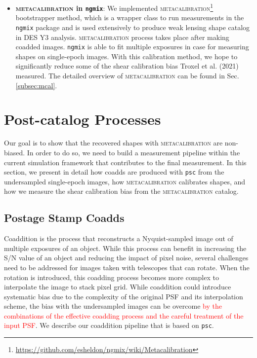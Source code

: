 \documentclass[fleqn,usenatbib]{mnras}
\begin{document}
\begin{itemize}
    \item \textbf{\textsc{metacalibration} in \texttt{ngmix}}: We implemented \textsc{metacalibration}\footnote{\url{https://github.com/esheldon/ngmix/wiki/Metacalibration}} bootstrapper method, which is a wrapper class to run measurements in the \texttt{ngmix} package and is used extensively to produce weak lensing shape catalog in DES Y3 analysis. \textsc{metacalibration} process takes place after making coadded images. \texttt{ngmix} is able to fit multiple exposures in case for measuring shapes on single-epoch images. With this calibration method, we hope to significantly reduce some of the shear calibration bias Troxel et al. (2021) measured. The detailed overview of \textsc{metacalibration} can be found in Sec.\ref{subsec:mcal}. 
\end{itemize}



\section{Post-catalog Processes}
\label{sec:methods}
Our goal is to show that the recovered shapes with \textsc{metacalibration} are non-biased. In order to do so, we need to build a measurement pipeline within the current simulation framework that contributes to the final measurement. In this section, we present in detail how coadds are produced with \texttt{psc} from the undersampled single-epoch images, how \textsc{metacalibration} calibrates shapes, and how we measure the shear calibration bias from the \textsc{metacalibration} catalog. 


\subsection{Postage Stamp Coadds}
\label{subsec:psc}
Coaddition is the process that reconstructs a Nyquist-sampled image out of multiple exposures of an object. While this process can benefit in increasing the S/N value of an object and reducing the impact of pixel noise, several challenges need to be addressed for images taken with telescopes that can rotate. When the rotation is introduced, this coadding process becomes more complex to interpolate the image to stack pixel grid. While coaddition could introduce systematic bias due to the complexity of the original PSF and its interpolation scheme, the bias with the undersampled images can be overcome \textcolor{red}{by the combinations of the effective coadding process and the careful treatment of the input PSF}. We describe our coaddition pipeline that is based on \texttt{psc}.
\end{document}

